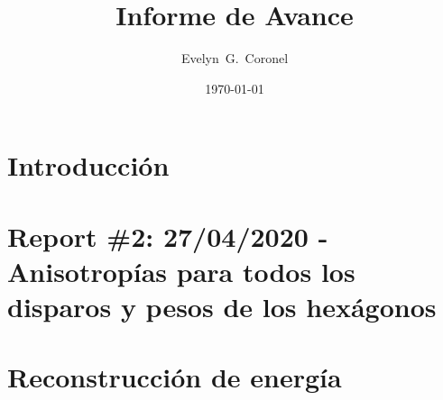 
\usepackage{natbib}





\title{Informe de Avance}
\author{Evelyn~G.~Coronel}


\date[]{\lowercase{\today}} %


\maketitle

\section{Introducción}


\graphicspath{{report_0_Introduccion/}}


% 

\section{Report \#2: 27/04/2020 - Anisotropías para todos los disparos y pesos de los hexágonos}
\graphicspath{{report_2_27_04_2020/}}


\section{Reconstrucción de energía}
\graphicspath{{report_3_07_05_2020/}}



